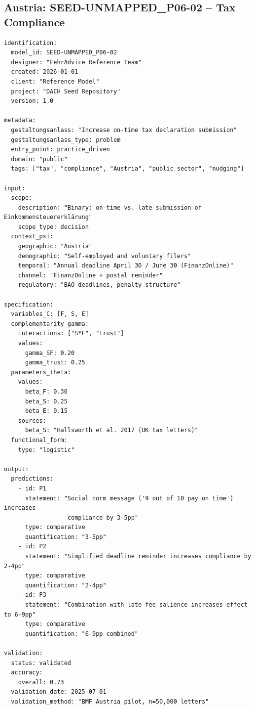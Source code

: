 \subsection{Austria: SEED-UNMAPPED_P06-02 -- Tax Compliance}

\begin{tcolorbox}[colback=white, colframe=blue!50!black,
    title=SEED-UNMAPPED_P06-02: Tax Declaration Timeliness (Austria)]
\begin{verbatim}
identification:
  model_id: SEED-UNMAPPED_P06-02
  designer: "FehrAdvice Reference Team"
  created: 2026-01-01
  client: "Reference Model"
  project: "DACH Seed Repository"
  version: 1.0

metadata:
  gestaltungsanlass: "Increase on-time tax declaration submission"
  gestaltungsanlass_type: problem
  entry_point: practice_driven
  domain: "public"
  tags: ["tax", "compliance", "Austria", "public sector", "nudging"]

input:
  scope:
    description: "Binary: on-time vs. late submission of Einkommensteuererklärung"
    scope_type: decision
  context_psi:
    geographic: "Austria"
    demographic: "Self-employed and voluntary filers"
    temporal: "Annual deadline April 30 / June 30 (FinanzOnline)"
    channel: "FinanzOnline + postal reminder"
    regulatory: "BAO deadlines, penalty structure"

specification:
  variables_C: [F, S, E]
  complementarity_gamma:
    interactions: ["S*F", "trust"]
    values:
      gamma_SF: 0.20
      gamma_trust: 0.25
  parameters_theta:
    values:
      beta_F: 0.30
      beta_S: 0.25
      beta_E: 0.15
    sources:
      beta_S: "Hallsworth et al. 2017 (UK tax letters)"
  functional_form:
    type: "logistic"

output:
  predictions:
    - id: P1
      statement: "Social norm message ('9 out of 10 pay on time') increases
                  compliance by 3-5pp"
      type: comparative
      quantification: "3-5pp"
    - id: P2
      statement: "Simplified deadline reminder increases compliance by 2-4pp"
      type: comparative
      quantification: "2-4pp"
    - id: P3
      statement: "Combination with late fee salience increases effect to 6-9pp"
      type: comparative
      quantification: "6-9pp combined"

validation:
  status: validated
  accuracy:
    overall: 0.73
  validation_date: 2025-07-01
  validation_method: "BMF Austria pilot, n=50,000 letters"
\end{verbatim}
\end{tcolorbox}

